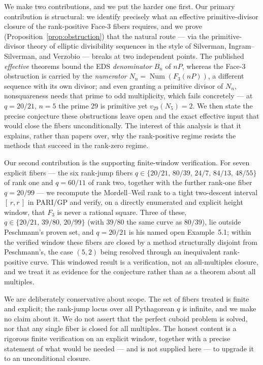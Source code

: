 \documentclass[11pt,reqno]{amsart}
\theoremstyle{plain}
\theoremstyle{definition}
\DeclareMathOperator{\Num}{Num}
\begin{document}
We make two contributions, and we put the harder one first. Our primary
contribution is structural: we identify precisely what an effective
primitive-divisor closure of the rank-positive Face-3 fibers requires, and we
prove (Proposition~\ref{prop:obstruction}) that the natural route --- via the
primitive-divisor theory of elliptic divisibility sequences in the style of
Silverman, Ingram--Silverman, and Verzobio --- breaks at two
independent points. The published \emph{effective} theorems bound the EDS
\emph{denominator} $B_n$ of $nP$, whereas the Face-3 obstruction is carried by
the \emph{numerator} $N_n=\Num(F_3(nP))$, a different sequence with its own
divisor; and even granting a primitive divisor of $N_n$, nonsquareness needs
that prime to odd multiplicity, which fails concretely --- at $q=20/21$, $n=5$
the prime $29$ is primitive yet $v_{29}(N_5)=2$. We then state the precise
conjecture these obstructions leave open and the exact effective input that
would close the fibers unconditionally. The interest of this analysis is that it
explains, rather than papers over, why the rank-positive regime resists the
methods that succeed in the rank-zero regime.

Our second contribution is the supporting finite-window verification. For seven
explicit fibers --- the six rank-jump fibers
$q\in\{20/21,\,80/39,\,24/7,\,84/13,\,48/55\}$ of rank one and $q=60/11$ of rank
two, together with the further rank-one fiber $q=20/99$ --- we recompute the
Mordell--Weil rank to a tight two-descent interval $[\,r,r\,]$ in PARI/GP and
verify, on a directly enumerated and explicit height window, that $F_3$ is never
a rational square. Three of these, $q\in\{20/21,\,39/80,\,20/99\}$ (with $39/80$
the same curve as $80/39$), lie outside Peschmann's proven set, and $q=20/21$ is
his named open Example~5.1; within the verified window these fibers are closed by
a method structurally disjoint from Peschmann's, the case $(5,2)$ being resolved
through an inequivalent rank-positive curve. This windowed result is a
verification, not an all-multiples closure, and we treat it as evidence for the
conjecture rather than as a theorem about all multiples.

We are deliberately conservative about scope. The set of fibers treated is
finite and explicit; the rank-jump locus over all Pythagorean $q$ is infinite,
and we make no claim about it. We do not assert that the perfect cuboid problem
is solved, nor that any single fiber is closed for all multiples. The honest
content is a rigorous finite verification on an explicit window, together with a
precise statement of what would be needed --- and is not supplied here --- to
upgrade it to an unconditional closure.
\end{document}
